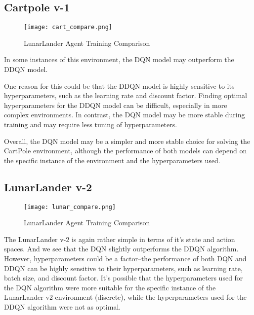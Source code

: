 \documentclass{article} %
\begin{document}
\subsection{Cartpole v-1}

\begin{figure}[H]
    \begin{center}
        \texttt{[image: cart\_compare.png]}
    \end{center}
    \caption{LunarLander Agent Training Comparison}
\end{figure}

In some instances of this environment, the DQN model may outperform the DDQN model.

One reason for this could be that the DDQN model is highly sensitive to its hyperparameters, such as the learning rate and discount factor. Finding optimal hyperparameters for the DDQN model can be difficult, especially in more complex environments. In contrast, the DQN model may be more stable during training and may require less tuning of hyperparameters.

Overall, the DQN model may be a simpler and more stable choice for solving the CartPole environment, although the performance of both models can depend on the specific instance of the environment and the hyperparameters used.

\subsection{LunarLander v-2}

\begin{figure}[H]
    \begin{center}
        \texttt{[image: lunar\_compare.png]}
    \end{center}
    \caption{LunarLander Agent Training Comparison}
\end{figure}

The LunarLander v-2 is again rather simple in terms of it's state and action spaces. And we
see that the DQN slightly outperforms the DDQN algorithm. However, hyperparameters could be
a factor--the performance of both DQN and DDQN can be highly sensitive to their
hyperparameters, such as learning rate, batch size, and discount factor. It's possible that
the
hyperparameters used for the DQN algorithm were more suitable for the specific instance of
the LunarLander v2 environment (discrete), while the hyperparameters used for the DDQN algorithm were
not as optimal.

\printbibliography
\end{document}
